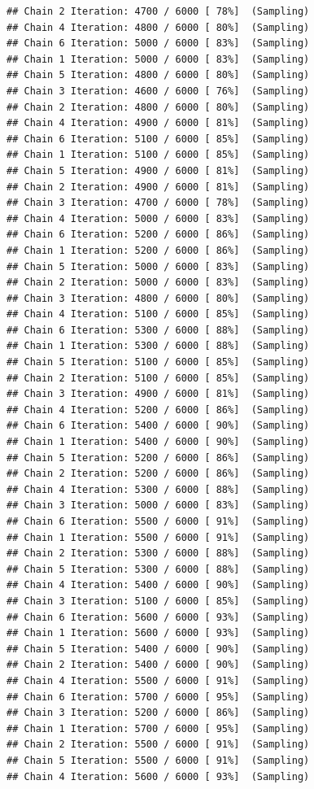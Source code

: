 \documentclass[
]{article}
\begin{document}
\begin{verbatim}
## Chain 2 Iteration: 4700 / 6000 [ 78%]  (Sampling) 
## Chain 4 Iteration: 4800 / 6000 [ 80%]  (Sampling) 
## Chain 6 Iteration: 5000 / 6000 [ 83%]  (Sampling) 
## Chain 1 Iteration: 5000 / 6000 [ 83%]  (Sampling) 
## Chain 5 Iteration: 4800 / 6000 [ 80%]  (Sampling) 
## Chain 3 Iteration: 4600 / 6000 [ 76%]  (Sampling) 
## Chain 2 Iteration: 4800 / 6000 [ 80%]  (Sampling) 
## Chain 4 Iteration: 4900 / 6000 [ 81%]  (Sampling) 
## Chain 6 Iteration: 5100 / 6000 [ 85%]  (Sampling) 
## Chain 1 Iteration: 5100 / 6000 [ 85%]  (Sampling) 
## Chain 5 Iteration: 4900 / 6000 [ 81%]  (Sampling) 
## Chain 2 Iteration: 4900 / 6000 [ 81%]  (Sampling) 
## Chain 3 Iteration: 4700 / 6000 [ 78%]  (Sampling) 
## Chain 4 Iteration: 5000 / 6000 [ 83%]  (Sampling) 
## Chain 6 Iteration: 5200 / 6000 [ 86%]  (Sampling) 
## Chain 1 Iteration: 5200 / 6000 [ 86%]  (Sampling) 
## Chain 5 Iteration: 5000 / 6000 [ 83%]  (Sampling) 
## Chain 2 Iteration: 5000 / 6000 [ 83%]  (Sampling) 
## Chain 3 Iteration: 4800 / 6000 [ 80%]  (Sampling) 
## Chain 4 Iteration: 5100 / 6000 [ 85%]  (Sampling) 
## Chain 6 Iteration: 5300 / 6000 [ 88%]  (Sampling) 
## Chain 1 Iteration: 5300 / 6000 [ 88%]  (Sampling) 
## Chain 5 Iteration: 5100 / 6000 [ 85%]  (Sampling) 
## Chain 2 Iteration: 5100 / 6000 [ 85%]  (Sampling) 
## Chain 3 Iteration: 4900 / 6000 [ 81%]  (Sampling) 
## Chain 4 Iteration: 5200 / 6000 [ 86%]  (Sampling) 
## Chain 6 Iteration: 5400 / 6000 [ 90%]  (Sampling) 
## Chain 1 Iteration: 5400 / 6000 [ 90%]  (Sampling) 
## Chain 5 Iteration: 5200 / 6000 [ 86%]  (Sampling) 
## Chain 2 Iteration: 5200 / 6000 [ 86%]  (Sampling) 
## Chain 4 Iteration: 5300 / 6000 [ 88%]  (Sampling) 
## Chain 3 Iteration: 5000 / 6000 [ 83%]  (Sampling) 
## Chain 6 Iteration: 5500 / 6000 [ 91%]  (Sampling) 
## Chain 1 Iteration: 5500 / 6000 [ 91%]  (Sampling) 
## Chain 2 Iteration: 5300 / 6000 [ 88%]  (Sampling) 
## Chain 5 Iteration: 5300 / 6000 [ 88%]  (Sampling) 
## Chain 4 Iteration: 5400 / 6000 [ 90%]  (Sampling) 
## Chain 3 Iteration: 5100 / 6000 [ 85%]  (Sampling) 
## Chain 6 Iteration: 5600 / 6000 [ 93%]  (Sampling) 
## Chain 1 Iteration: 5600 / 6000 [ 93%]  (Sampling) 
## Chain 5 Iteration: 5400 / 6000 [ 90%]  (Sampling) 
## Chain 2 Iteration: 5400 / 6000 [ 90%]  (Sampling) 
## Chain 4 Iteration: 5500 / 6000 [ 91%]  (Sampling) 
## Chain 6 Iteration: 5700 / 6000 [ 95%]  (Sampling) 
## Chain 3 Iteration: 5200 / 6000 [ 86%]  (Sampling) 
## Chain 1 Iteration: 5700 / 6000 [ 95%]  (Sampling) 
## Chain 2 Iteration: 5500 / 6000 [ 91%]  (Sampling) 
## Chain 5 Iteration: 5500 / 6000 [ 91%]  (Sampling) 
## Chain 4 Iteration: 5600 / 6000 [ 93%]  (Sampling) 

\end{verbatim}
\end{document}
